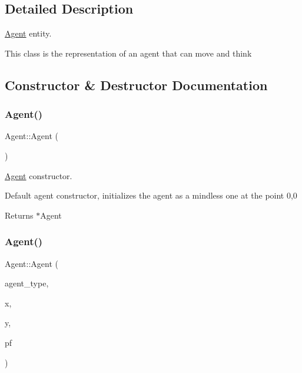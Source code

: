 \subsection{Detailed Description}
\mbox{\hyperlink{class_agent}{Agent}} entity. 

This class is the representation of an agent that can move and think 

\subsection{Constructor \& Destructor Documentation}
\mbox{\label{class_agent_a24a60f1d260bf19a4f7f8a5f36881d3f}} 
\subsubsection{\texorpdfstring{Agent()}{Agent()}\hspace{0.1cm}{\footnotesize\ttfamily [1/3]}}
{\footnotesize\ttfamily Agent\+::\+Agent (\begin{DoxyParamCaption}{ }\end{DoxyParamCaption})}



\mbox{\hyperlink{class_agent}{Agent}} constructor. 

Default agent constructor, initializes the agent as a mindless one at the point 0,0

\begin{DoxyReturn}{Returns}
$\ast$\+Agent 
\end{DoxyReturn}
\mbox{\label{class_agent_a5818e33f8735384a8e74a8be0417636e}} 
\subsubsection{\texorpdfstring{Agent()}{Agent()}\hspace{0.1cm}{\footnotesize\ttfamily [2/3]}}
{\footnotesize\ttfamily Agent\+::\+Agent (\begin{DoxyParamCaption}\item[{const Agent\+Type}]{agent\+\_\+type,  }\item[{const float}]{x,  }\item[{const float}]{y,  }\item[{\mbox{\hyperlink{class_path_finder}{Path\+Finder}} $\ast$}]{pf }\end{DoxyParamCaption})}



